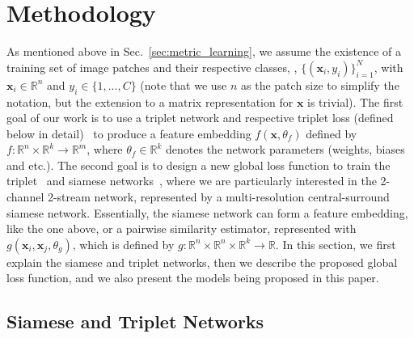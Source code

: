 \documentclass[10pt,twocolumn,letterpaper]{article}
\begin{document}
\section{Methodology}

As mentioned above in Sec.~\ref{sec:metric_learning}, we assume the existence of a training set of image patches and their respective classes, \ie, $\{ (\mathbf{x}_i,y_i) \}_{i=1}^N$, with $\mathbf{x}_i \in \mathbb R^n$ and $y_i \in \{1,...,C\}$ (note that we use $n$ as the patch size to simplify the notation, but the extension to a matrix representation for $\mathbf{x}$ is trivial).  The first goal of our work is to use a triplet network and respective triplet loss (defined below in detail)~\cite{Wangcvpr14,hoffer2014deep,SchroffKPcvpr15,wohlhartcvpr15} to produce a feature embedding $f(\mathbf{x},\theta_f)$ defined by $f: \mathbb R^n \times \mathbb R^k \rightarrow \mathbb R^m$, where $\theta_f \in \mathbb R^k$ denotes the network parameters (weights, biases and etc.).  The second goal is to design a new global loss function to train the triplet~\cite{Wangcvpr14,hoffer2014deep,SchroffKPcvpr15,wohlhartcvpr15} and siamese networks~\cite{Han_cvpr15,masci2014descriptor,ZagoruykoCVPR15}, where we are particularly interested in the 2-channel 2-stream network, represented by a multi-resolution central-surround siamese network.  Essentially, the siamese network can form a feature embedding, like the one above, or a pairwise similarity estimator, represented with $g(\mathbf{x}_i,\mathbf{x}_j , \theta_g)$, which is defined by $g: \mathbb R^n \times \mathbb R^n \times \mathbb R^k \rightarrow \mathbb R$.  In this section, we first explain the siamese and triplet networks, then we describe the proposed global loss function, and we also present the models being proposed in this paper.



\subsection{Siamese and Triplet Networks}
\label{sec:network_architecture}
\end{document}
